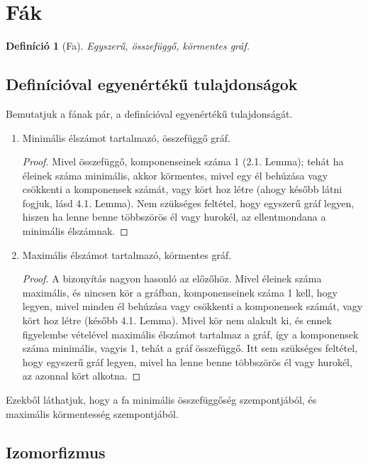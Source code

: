 \documentclass{article}
\newtheorem{definition}{Definíció}[section]
\begin{document}
\section{Fák}
\begin{definition}[Fa]
    Egyszerű, összefüggő, körmentes gráf.
\end{definition}

\subsection{Definícióval egyenértékű tulajdonságok}

Bemutatjuk a fának pár, a definícióval egyenértékű tulajdonságát.

\begin{enumerate}
    \item Minimális élszámot tartalmazó, összefüggő gráf.
    \begin{proof}
        Mivel összefüggő, komponenseinek száma 1 (2.1. Lemma); tehát ha éleinek száma minimális, akkor körmentes, mivel egy él behúzása vagy csökkenti a komponensek számát, vagy kört hoz létre (ahogy később látni fogjuk, lásd 4.1. Lemma).
        Nem szükséges feltétel, hogy egyszerű gráf legyen, hiszen ha lenne benne többszörös él vagy hurokél, az ellentmondana a minimális élszámnak.
    \end{proof}
    \item Maximális élszámot tartalmazó, körmentes gráf.
    \begin{proof}
        A bizonyítás nagyon hasonló az előzőhöz. Mivel éleinek száma maximális, és nincsen kör a gráfban, komponenseinek száma 1 kell, hogy legyen, mivel minden él behúzása vagy csökkenti a komponensek számát, vagy kört hoz létre (később 4.1. Lemma). Mivel kör nem alakult ki, és ennek figyelembe vételével maximális élszámot tartalmaz a gráf, így a komponensek száma minimális, vagyis 1, tehát a gráf összefüggő.
        Itt sem szükséges feltétel, hogy egyszerű gráf legyen, mivel ha lenne benne többszörös él vagy hurokél, az azonnal kört alkotna.
    \end{proof}
\end{enumerate}

Ezekből láthatjuk, hogy a fa minimális összefüggőség szempontjából, és maximális körmentesség szempontjából.

\subsection{Izomorfizmus}
\end{document}
